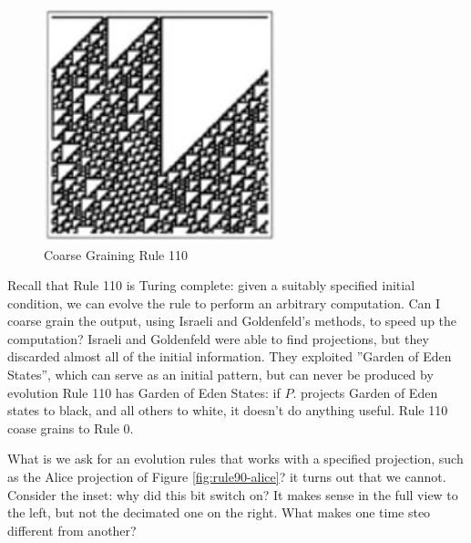\documentclass[]{article}
\begin{document}
\begin{figure}[H]
	\begin{center}
		\caption{Coarse Graining Rule 110}\label{fig:cellular-automaton-rule-6a}
		\includegraphics[width=0.6\textwidth]{cellular-automaton-rule-6}
	\end{center}
\end{figure}

Recall that Rule 110 is Turing complete: given a suitably specified initial condition, we can evolve the rule to perform an arbitrary computation. Can I coarse grain the output, using Israeli and Goldenfeld's methods, to speed up the computation? Israeli and Goldenfeld were able to find projections, but they discarded almost all of the initial information. They exploited ''Garden of Eden States'', which can serve as an initial pattern, but can never be produced by evolution Rule 110 has Garden of Eden States: if $P$. projects Garden of Eden states to black, and all others to white, it doesn't do anything useful. Rule 110 coase grains to Rule 0.


What is we ask for an evolution rules that works with a specified projection, such as the Alice projection of Figure \ref{fig:rule90-alice}? it turns out that we cannot. Consider the inset: why did this bit switch on? It makes sense in the full view to the left, but not the decimated one on the right. What makes one time steo different from another?
\end{document}

